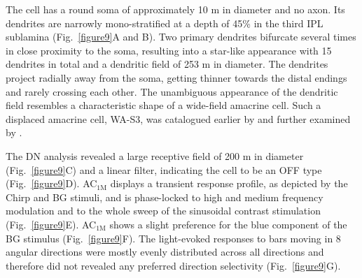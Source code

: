 The cell has a round soma of approximately 10 \textmu m in diameter and no axon. Its dendrites are narrowly mono-stratified at a depth of 45\% in the third IPL sublamina (Fig.~\ref{figure9}A and B). Two primary dendrites bifurcate several times in close proximity to the soma, resulting into a star-like appearance with 15 dendrites in total and a dendritic field of 253 \textmu m in diameter. The dendrites project radially away from the soma, getting thinner towards the distal endings and rarely crossing each other. The unambiguous appearance of the dendritic field resembles a characteristic shape of a wide-field amacrine cell. Such a displaced amacrine cell, WA-S3, was catalogued earlier by \citet{sevilla07} and further examined by \citet{majumdar09}. 

The DN analysis revealed a large receptive field of 200 \textmu m in diameter (Fig.~\ref{figure9}C) and a linear filter, indicating the cell to be an OFF type (Fig.~\ref{figure9}D). AC$_{\text{1M}}$ displays a transient response profile, as depicted by the Chirp and BG stimuli, and is phase-locked to high and medium frequency modulation and to the whole sweep of the sinusoidal contrast stimulation (Fig.~\ref{figure9}E). AC$_{\text{1M}}$ shows a slight preference for the blue component of the BG stimulus (Fig.~\ref{figure9}F). The light-evoked responses to bars moving in 8 angular directions were mostly evenly distributed across all directions and therefore did not revealed any preferred direction selectivity (Fig.~\ref{figure9}G).



